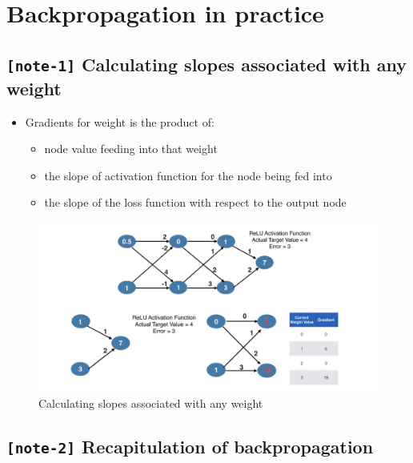 \documentclass[11pt, twoside]{article}
\begin{document}
    \hypertarget{backpropagation-in-practice}{%
\section{Backpropagation in
practice}\label{backpropagation-in-practice}}

    \hypertarget{note-1-calculating-slopes-associated-with-any-weight}{%
\subsection{\texorpdfstring{\texttt{{[}note-1{]}} Calculating slopes
associated with any
weight}{{[}note-1{]} Calculating slopes associated with any weight}}\label{note-1-calculating-slopes-associated-with-any-weight}}

\begin{itemize}
\item
  Gradients for weight is the product of:

  \begin{itemize}
  \item
    node value feeding into that weight
  \item
    the slope of activation function for the node being fed into
  \item
    the slope of the loss function with respect to the output node
  \end{itemize}
\end{itemize}

\begin{figure}
\centering
\includegraphics{../Figures/12. Calculating slopes associated with any weight.jpg}
\caption{Calculating slopes associated with any weight}
\end{figure}

    \hypertarget{note-2-recapitulation-of-backpropagation}{%
\subsection{\texorpdfstring{\texttt{{[}note-2{]}} Recapitulation of
backpropagation}{{[}note-2{]} Recapitulation of backpropagation}}\label{note-2-recapitulation-of-backpropagation}}
\end{document}

